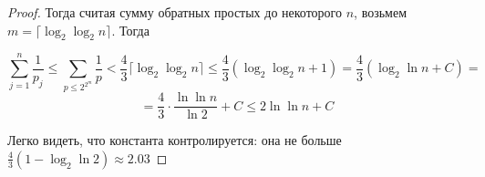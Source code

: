 \begin{enumerate}
\begin{proof}
        Тогда считая сумму обратных простых до некоторого $n$, возьмем $m = \lceil \log_2 \log_2 n \rceil$. Тогда

        \begin{equation*}
            \sum_{j=1}^n \frac{1}{p_j} \leq \sum_{p \leq 2^{2^m}} \frac{1}{p} < \frac{4}{3}\lceil \log_2 \log_2 n \rceil
            \leq \frac{4}{3} (\log_2 \log_2 n + 1) = \frac{4}{3}(\log_2 \ln n + C) =
        \end{equation*}
        \begin{equation*}
            = \frac{4}{3} \cdot \frac{\ln \ln n}{\ln 2} + C \leq 2 \ln \ln n + C
        \end{equation*}

        Легко видеть, что константа контролируется: она не больше $\frac{4}{3} (1 - \log_2 \ln 2) \approx 2.03$
    \end{proof}   


\end{enumerate}
